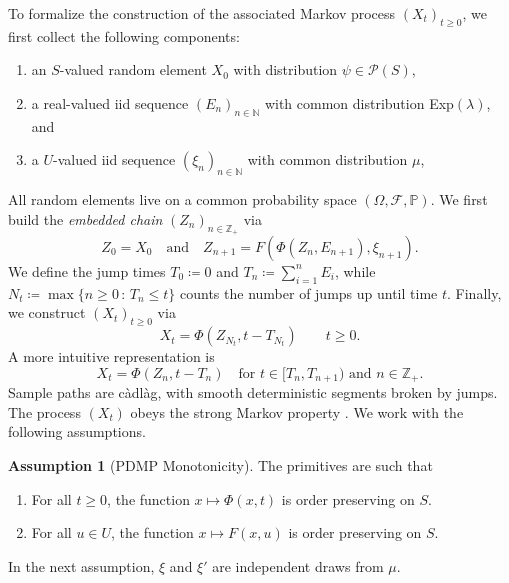 \documentclass[12pt,reqno]{amsart}
\numberwithin{equation}{section}
\theoremstyle{definition}
\newtheorem{assumption}{Assumption}[section]
\newcommand{\1}{\mathbbm{1}}
\newcommand{\NN}{\mathbb{N}}
\newcommand{\ZZ}{\mathbb{Z}}
\newcommand{\PP}{\mathbb P}
\newcommand{\fF}{\mathcal{F}}
\newcommand{\pP}{\mathscr{P}}
\newcommand{\navy}[1]{\textit{\textcolor{blue!40!black}{#1}}}
\begin{document}
To formalize the construction of the associated Markov process $(X_t)_{t \geq
0}$, we first collect the following components:
%
\begin{enumerate}
    \item an $S$-valued random element $X_0$ with distribution $\psi \in \pP(S)$,
    \item a real-valued {\sc iid} sequence $(E_n)_{n \in \NN}$ with common distribution
        Exp$(\lambda)$, and
    \item a $U$-valued {\sc iid} sequence $(\xi_n)_{n \in \NN}$ with common distribution $\mu$,
\end{enumerate}
%
All random elements live on a common probability space $(\Omega, \fF, \PP)$.
We first build the \navy{embedded chain} $(Z_n)_{n \in \ZZ_+}$ via
%
\begin{equation*}
    Z_0 = X_0
    \quad \text{and} \quad
    Z_{n+1} = F(\Phi(Z_n, E_{n+1}), \xi_{n + 1}).
\end{equation*}
%
We define the jump times $T_0 \coloneq 0$ and $T_n \coloneq \sum_{i=1}^n E_i$,
while $N_t \coloneq \max \{n \geq 0 \,:\, T_n \leq t\}$ counts the number of jumps up until time
$t$. Finally, we construct $(X_t)_{t \geq 0}$ via
%
\begin{equation*}
    X_t = \Phi(Z_{N_t}, t - T_{N_t}) \qquad t \geq 0.
\end{equation*}
%
A more intuitive representation is
%
\begin{equation*}
        X_t = \Phi(Z_n, t - T_n)
        \quad \text{for $t \in [T_n, T_{n+1})$ and $n \in \ZZ_+$.}
\end{equation*}
%
Sample paths are c\`adl\`ag, with smooth deterministic segments broken by
jumps. The process $(X_t)$ obeys the strong Markov property
\citep[Theorem~2.4]{rudnicki2017piecewise}. 
We work with the following assumptions.

\begin{assumption}[PDMP Monotonicity]\label{ass:flow}
    The primitives are such that
    \begin{enumerate}
        \item For all $t \geq 0$, the function $x \mapsto \Phi(x, t)$ is order
            preserving on $S$.  
        \item For all $u \in U$, the function $x \mapsto F(x, u)$ is order preserving on $S$.
    \end{enumerate}
\end{assumption}

In the next assumption, $\xi$ and $\xi'$ are independent draws from $\mu$.
\end{document}

